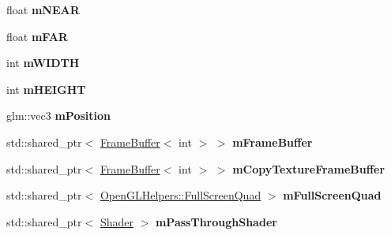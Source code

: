 \begin{DoxyCompactItemize}
\item 
float {\bfseries m\+N\+E\+AR}\hypertarget{class_cubemap_renderer_a86e41f5601710e0c8e50dcaa8bed103c}{}\label{class_cubemap_renderer_a86e41f5601710e0c8e50dcaa8bed103c}

\item 
float {\bfseries m\+F\+AR}\hypertarget{class_cubemap_renderer_a3cfe44c6e37d07f881ede9b53e5bc464}{}\label{class_cubemap_renderer_a3cfe44c6e37d07f881ede9b53e5bc464}

\item 
int {\bfseries m\+W\+I\+D\+TH}\hypertarget{class_cubemap_renderer_a3a51c98788a7b6c8a7d808ed7c0c6e49}{}\label{class_cubemap_renderer_a3a51c98788a7b6c8a7d808ed7c0c6e49}

\item 
int {\bfseries m\+H\+E\+I\+G\+HT}\hypertarget{class_cubemap_renderer_ab4b8f75ad23dcdd0e3c2c53e02a370d9}{}\label{class_cubemap_renderer_ab4b8f75ad23dcdd0e3c2c53e02a370d9}

\item 
glm\+::vec3 {\bfseries m\+Position}\hypertarget{class_cubemap_renderer_ab75b59ac05619624aee8a0211de352a5}{}\label{class_cubemap_renderer_ab75b59ac05619624aee8a0211de352a5}

\item 
std\+::shared\+\_\+ptr$<$ \hyperlink{class_frame_buffer}{Frame\+Buffer}$<$ int $>$ $>$ {\bfseries m\+Frame\+Buffer}\hypertarget{class_cubemap_renderer_ae19a90e9ca2c4006432761440039168f}{}\label{class_cubemap_renderer_ae19a90e9ca2c4006432761440039168f}

\item 
std\+::shared\+\_\+ptr$<$ \hyperlink{class_frame_buffer}{Frame\+Buffer}$<$ int $>$ $>$ {\bfseries m\+Copy\+Texture\+Frame\+Buffer}\hypertarget{class_cubemap_renderer_a555a5ed25b351bc4439bb8738c1a28fd}{}\label{class_cubemap_renderer_a555a5ed25b351bc4439bb8738c1a28fd}

\item 
std\+::shared\+\_\+ptr$<$ \hyperlink{class_open_g_l_helpers_1_1_full_screen_quad}{Open\+G\+L\+Helpers\+::\+Full\+Screen\+Quad} $>$ {\bfseries m\+Full\+Screen\+Quad}\hypertarget{class_cubemap_renderer_acf58d00882f70d5a6bac8466fbb93abb}{}\label{class_cubemap_renderer_acf58d00882f70d5a6bac8466fbb93abb}

\item 
std\+::shared\+\_\+ptr$<$ \hyperlink{class_shader}{Shader} $>$ {\bfseries m\+Pass\+Through\+Shader}\hypertarget{class_cubemap_renderer_aab76c4e9fe6d7cdcf4747a818b23af4e}{}\label{class_cubemap_renderer_aab76c4e9fe6d7cdcf4747a818b23af4e}


\end{DoxyCompactItemize}
